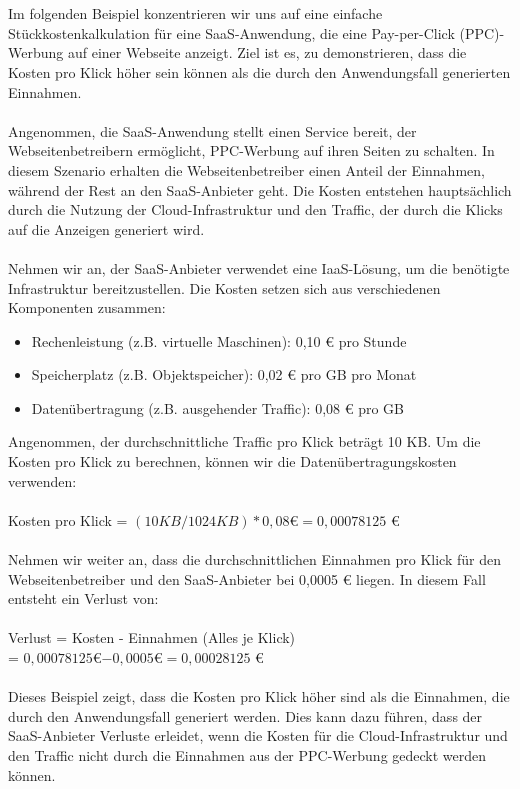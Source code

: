 \documentclass[../vs-script-first-v01.tex]{subfiles}
\begin{document}
\\\\
Im folgenden Beispiel konzentrieren wir uns auf eine einfache Stückkostenkalkulation für eine SaaS-Anwendung, die eine Pay-per-Click (PPC)-Werbung auf einer Webseite anzeigt. Ziel ist es, zu demonstrieren, dass die Kosten pro Klick höher sein können als die durch den Anwendungsfall generierten Einnahmen.
\\\\
Angenommen, die SaaS-Anwendung stellt einen Service bereit, der Webseitenbetreibern ermöglicht, PPC-Werbung auf ihren Seiten zu schalten. In diesem Szenario erhalten die Webseitenbetreiber einen Anteil der Einnahmen, während der Rest an den SaaS-Anbieter geht. Die Kosten entstehen hauptsächlich durch die Nutzung der Cloud-Infrastruktur und den Traffic, der durch die Klicks auf die Anzeigen generiert wird.
\\\\
Nehmen wir an, der SaaS-Anbieter verwendet eine IaaS-Lösung, um die benötigte Infrastruktur bereitzustellen. Die Kosten setzen sich aus verschiedenen Komponenten zusammen:
\begin{itemize}
\item Rechenleistung (z.B. virtuelle Maschinen): 0,10 € pro Stunde
\item Speicherplatz (z.B. Objektspeicher): 0,02 € pro GB pro Monat
\item Datenübertragung (z.B. ausgehender Traffic): 0,08 € pro GB
\end{itemize}
Angenommen, der durchschnittliche Traffic pro Klick beträgt 10 KB. Um die Kosten pro Klick zu berechnen, können wir die Datenübertragungskosten verwenden:
\\\\
Kosten pro Klick = $(10 KB / 1024 KB) * 0,08 $€$ = 0,00078125$ €
\\\\
Nehmen wir weiter an, dass die durchschnittlichen Einnahmen pro Klick für den Webseitenbetreiber und den SaaS-Anbieter bei 0,0005 € liegen. In diesem Fall entsteht ein Verlust von:
\\\\
Verlust = Kosten - Einnahmen (Alles je Klick) \\
= $0,00078125 $€$ - 0,0005 $€$ = 0,00028125$ €
\\\\
Dieses Beispiel zeigt, dass die Kosten pro Klick höher sind als die Einnahmen, die durch den Anwendungsfall generiert werden. Dies kann dazu führen, dass der SaaS-Anbieter Verluste erleidet, wenn die Kosten für die Cloud-Infrastruktur und den Traffic nicht durch die Einnahmen aus der PPC-Werbung gedeckt werden können.
\end{document}
